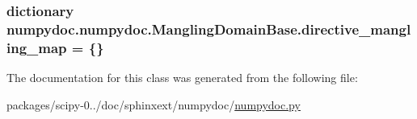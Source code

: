 \subsubsection[{directive\+\_\+mangling\+\_\+map}]{\setlength{\rightskip}{0pt plus 5cm}dictionary numpydoc.\+numpydoc.\+Mangling\+Domain\+Base.\+directive\+\_\+mangling\+\_\+map = \{\}\hspace{0.3cm}{\ttfamily [static]}}\label{classnumpydoc_1_1numpydoc_1_1ManglingDomainBase_a73609774530c70f2d3c7ba8f857f70d2}


The documentation for this class was generated from the following file\+:\begin{DoxyCompactItemize}
\item 
packages/scipy-\/0../doc/sphinxext/numpydoc/\hyperlink{numpydoc_8py}{numpydoc.\+py}\end{DoxyCompactItemize}
